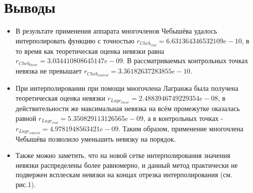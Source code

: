 \documentclass[14pt, a4paper]{article}
\begin{document}
  \section{Выводы}
  \begin{itemize}
  \item
  В результате применения аппарата многочленов Чебышёва удалось интерполировать функцию с точностью $r_{Cheb_{real}} = 6.631364346532109e-10$, в то время как теоретическая оценка невязки равна $r_{Cheb_{theor}} = 3.034410808645147e-09$. В рассматриваемых контрольных точках невязка не превышает $r_{Cheb_{control}} = 3.36182637283855e-10$.
  \item
  При интерполировании при помощи многочлена Лагранжа была получена теоретическая оценка невязки $r_{Lagr_{theor}} = 2.4883946749229354e-08$, в действительности же максимальная невязка на всём промежутке оказалась равной $r_{Lagr_{real}} = 5.350829113126565e-09$, а в контрольных точках - $r_{Lagr_{control}} = 4.9781948563421e-09$. Таким образом, применение многочлена Чебышёва позволило уменьшить невязку на порядок.
  \item
  Также можно заметить, что на новой сетке интерполирования значения невязки распределены более равномерно, и данный метод практически не подвержен всплескам невязки на концах отрезка интерполирования (см. рис.1).
  \end{itemize}
\end{document}
